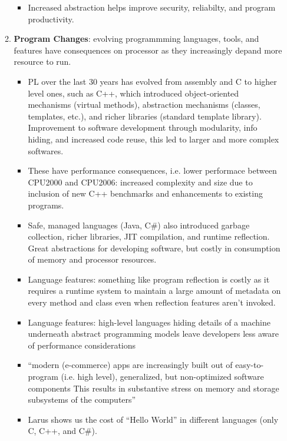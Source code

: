 \documentclass [12pt]{article}
\begin{document}
\begin{itemize}
\begin{enumerate}
\begin{itemize}
                            \item Increased abstraction helps improve security, reliabilty, and program productivity. 
                        \end{itemize}
                    \item \textbf{Program Changes}: evolving programmming languages, tools, and features have consequences on processor as they increasingly depand more resource to run. 
                        \begin{itemize}
                            \item PL over the last 30 years has evolved from assembly and C to higher level ones, such as C++, which introduced object-oriented mechanisms (virtual methods), abstraction mechanisms (classes, templates, etc.), and richer libraries (standard template library). Improvement to software development through modularity, info hiding, and increased code reuse, this led to larger and more complex softwares.
                            \item These have performance consequences, i.e. lower performace between CPU2000 and CPU2006: increased complexity and size due to inclusion of new C++ benchmarks and enhancements to existing programs. 
                            \item Safe, managed languages (Java, C\#) also introduced garbage collection, richer libraries, JIT compilation, and runtime reflection. Great abstractions for developing software, but costly in consumption of memory and processor resources. 
                            \item Language features: something like program reflection is costly as it requires a runtime system to maintain a large amount of metadata on every method and class even when reflection features aren't invoked. 
                            \item Language features: high-level languages hiding details of a machine underneath abstract programming models leave developers less aware of performance considerations
                            \item ``modern (e-commerce) apps are increasingly built out of easy-to-program (i.e. high level), generalized, but non-optimized software components This results in substantive stress on memory and storage subsystems of the computers''
                            \item Larus shows us the cost of ``Hello World'' in different languages (only C, C++, and C\#). 
                        \end{itemize}

\end{enumerate}
\end{itemize}
\end{document}
